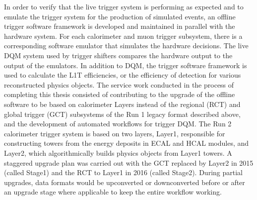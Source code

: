 \indent In order to verify that the live trigger system is performing as expected and to emulate the trigger system for the production of simulated events, an offline trigger software framework is developed and maintained in parallel with the hardware system. For each calorimeter and muon trigger subsystem, there is a corresponding software emulator that simulates the hardware decisions. The live DQM system used by trigger shifters compares the hardware output to the output of the emulators. In addition to DQM, the trigger software framework is used to calculate the L1T efficiencies, or the efficiency of detection for various reconstructed physics objects. The service work conducted in the process of completing this thesis consisted of contributing to the upgrade of the offline software to be based on calorimeter Layers instead of the regional (RCT) and global trigger (GCT) subsystems of the Run 1 legacy format described above, and the development of automated workflows for trigger DQM. The Run 2 calorimeter trigger system is based on two layers, Layer1, responsible for constructing towers from the energy deposits in ECAL and HCAL modules, and Layer2, which algorithmically builds physics objects from Layer1 towers. A staggered upgrade plan was carried out with the GCT replaced by Layer2 in 2015 (called Stage1) and the RCT to Layer1 in 2016 (called Stage2). During partial upgrades, data formats would be upconverted or downconverted before or after an upgrade stage where applicable to keep the entire workflow working. 


